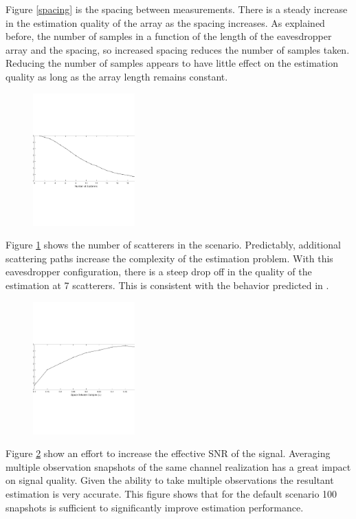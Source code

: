 \documentclass{allertonproc}
\begin{document}
Figure \ref{spacing} is the spacing between measurements. There is a steady increase in the estimation quality of the array as the spacing increases. As explained before, the number of samples in a function of the length of the eavesdropper array and the spacing, so increased spacing reduces the number of samples taken. Reducing the number of samples appears to have little effect on the estimation quality as long as the array length remains constant.
\begin{figure}[ht!]
\begin{center}
\includegraphics[height=2in]{numScatterers}
\caption{}\label{Scatter}
\end{center}
\end{figure}

Figure \ref{Scatter} shows the number of scatterers in the scenario. Predictably, additional scattering paths increase the complexity of the estimation problem. With this eavesdropper configuration, there is a steep drop off in the quality of the estimation at 7 scatterers. This is consistent with the behavior predicted in \cite{kckpVTC2015}. 

\begin{figure}[ht!]
\begin{center}
\includegraphics[height=2in]{wavelengths}
\caption{}\label{SNR}
\end{center}
\end{figure}

Figure \ref{SNR} show an effort to increase the effective SNR of the signal. Averaging multiple observation snapshots of the same channel realization has a great impact on signal quality. Given the ability to take multiple observations the resultant estimation is very accurate. This figure shows that for the default scenario 100 snapshots is sufficient to significantly improve estimation performance. 
\end{document}
